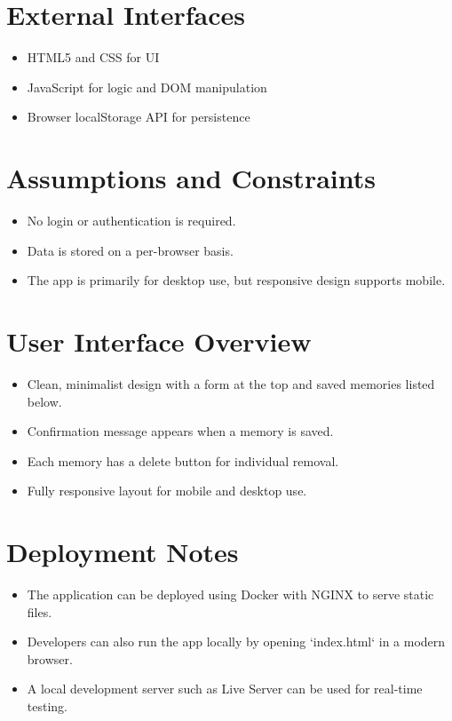 \documentclass[12pt]{article}
\begin{document}
\section{External Interfaces}
\begin{itemize}
  \item HTML5 and CSS for UI
  \item JavaScript for logic and DOM manipulation
  \item Browser localStorage API for persistence
\end{itemize}

\section{Assumptions and Constraints}
\begin{itemize}
  \item No login or authentication is required.
  \item Data is stored on a per-browser basis.
  \item The app is primarily for desktop use, but responsive design supports mobile.
\end{itemize}

\section{User Interface Overview}
\begin{itemize}
  \item Clean, minimalist design with a form at the top and saved memories listed below.
  \item Confirmation message appears when a memory is saved.
  \item Each memory has a delete button for individual removal.
  \item Fully responsive layout for mobile and desktop use.
\end{itemize}

\section{Deployment Notes}
\begin{itemize}
  \item The application can be deployed using Docker with NGINX to serve static files.
  \item Developers can also run the app locally by opening `index.html` in a modern browser.
  \item A local development server such as Live Server can be used for real-time testing.
\end{itemize}
\end{document}
